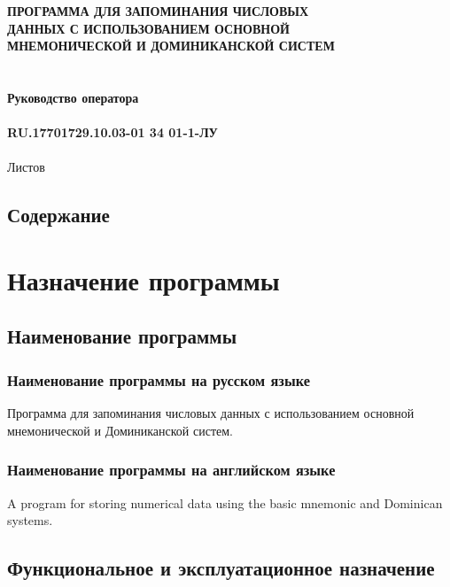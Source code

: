 \documentclass[draft]{article}
\begin{document}
\bigskip
\begin{center}
\topskip=0pt
\vspace*{\fill}
\textbf{ПРОГРАММА ДЛЯ ЗАПОМИНАНИЯ ЧИСЛОВЫХ\\
 ДАННЫХ С ИСПОЛЬЗОВАНИЕМ ОСНОВНОЙ\\
 МНЕМОНИЧЕСКОЙ И ДОМИНИКАНСКОЙ СИСТЕМ\\
~\\
~\\
Руководство оператора\\
~\\
RU.17701729.10.03-01 34 01-1-ЛУ}\\
~\\
Листов \ztotpages\\
\vspace*{\fill}
\end{center}
\begin{center}
\end{center}
\newpage
\begin{center}
\section {Содержание}
\tableofcontents
\end{center}
\newpage
\section{Назначение программы}
\subsection{Наименование программы}
\subsubsection{Наименование программы на русском языке}
Программа для запоминания числовых данных с использованием основной мнемонической и Доминиканской систем.
\subsubsection{Наименование программы на английском языке}
A program for storing numerical data using the basic mnemonic and Dominican systems.
\subsection{Функциональное и эксплуатационное назначение}
\end{document}

